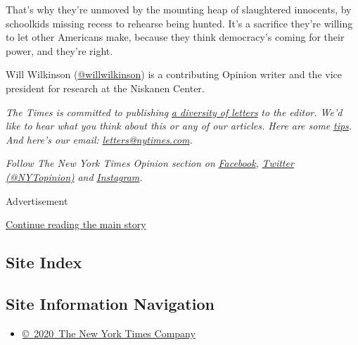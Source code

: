 That's why they're unmoved by the mounting heap of slaughtered
innocents, by schoolkids missing recess to rehearse being hunted. It's a
sacrifice they're willing to let other Americans make, because they
think democracy's coming for their power, and they're right.

Will Wilkinson
(\href{https://twitter.com/willwilkinson}{@willwilkinson}) is a
contributing Opinion writer and the vice president for research at the
Niskanen Center.

\emph{The Times is committed to publishing}
\href{https://www.nytimes.com/2019/01/31/opinion/letters/letters-to-editor-new-york-times-women.html}{\emph{a
diversity of letters}} \emph{to the editor. We'd like to hear what you
think about this or any of our articles. Here are some}
\href{https://help.nytimes.com/hc/en-us/articles/115014925288-How-to-submit-a-letter-to-the-editor}{\emph{tips}}\emph{.
And here's our email:}
\href{mailto:letters@nytimes.com}{\emph{letters@nytimes.com}}\emph{.}

\emph{Follow The New York Times Opinion section on}
\href{https://www.facebook.com/nytopinion}{\emph{Facebook}}\emph{,}
\href{http://twitter.com/NYTOpinion}{\emph{Twitter (@NYTopinion)}}
\emph{and}
\href{https://www.instagram.com/nytopinion/}{\emph{Instagram}}\emph{.}

Advertisement

\protect\hyperlink{after-bottom}{Continue reading the main story}

\hypertarget{site-index}{%
\subsection{Site Index}\label{site-index}}

\hypertarget{site-information-navigation}{%
\subsection{Site Information
Navigation}\label{site-information-navigation}}

\begin{itemize}
\tightlist
\item
  \href{https://help.nytimes.com/hc/en-us/articles/115014792127-Copyright-notice}{©~2020~The
  New York Times Company}
\end{itemize}

